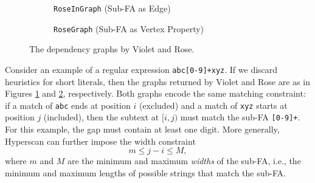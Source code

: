 \begin{figure}[htbp]
  \centering
  \begin{subfigure}[b]{0.48\textwidth}

    \centering
    \caption{\texttt{RoseInGraph} (Sub-FA as Edge)}
    \label{fig:rose_in_graph}
  \end{subfigure}
  \hfill
  \begin{subfigure}[b]{0.48\textwidth}
    \centering
    \caption{\texttt{RoseGraph} (Sub-FA as Vertex Property)}
    \label{fig:rose_graph}
  \end{subfigure}
  \caption{The dependency graphs by Violet and Rose.}
  \label{fig:graph_comparison}
\end{figure}


Consider an example of a regular expression \texttt{abc[0-9]+xyz}. If we discard heuristics for short literals, then the graphs returned by Violet and Rose are as in Figures \ref{fig:rose_in_graph} and \ref{fig:rose_graph}, respectively. Both graphs encode the same matching constraint: if a match of \texttt{abc} ends at position $i$ (excluded) and a match of \texttt{xyz} starts at position $j$ (included), then the subtext at $[i, j)$ must match the sub-FA \texttt{[0-9]+}. For this example, the gap must contain at least one digit. More generally, Hyperscan can further impose the width constraint
$$m \le j-i \le M,$$
where $m$ and $M$ are the minimum and maximum \textit{widths} of the sub-FA, i.e., the minimum and maximum lengths of possible strings that match the sub-FA.

